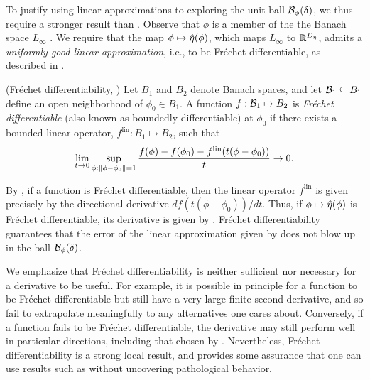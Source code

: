 To justify using linear approximations to exploring the unit ball
$\mathcal{B}_\phi(\delta)$, we thus require a stronger result than
.  Observe that $\phi$ is a member of the the Banach
space $L_\infty$ \citep[Theorem 5.2.1]{dudley:2018:real}.  We require that the
map $\phi \mapsto \hat\eta(\phi)$, which maps $L_\infty$ to
$\mathbb{R}^{D_{\eta}}$, admits a {\em uniformly good linear approximation}, i.e.,
to be Fr{\'e}chet differentiable, as described in .

\begin{defn}
    (Fr{\'e}chet differentiability,
    \citep[Definition 4.5]{zeidler:2013:functional})
%
Let $B_1$ and $B_2$ denote Banach spaces, and let $\mathcal{B}_1 \subseteq B_1$ define
an open neighborhood of $\phi_0 \in B_1$.
%
A function $f: \mathcal{B}_1 \mapsto B_2$ is {\em Fr{\'echet} differentiable} (also
known as boundedly differentiable) at $\phi_0$ if there exists a  bounded linear
operator, $f^{\mathrm{lin}}: B_1 \mapsto B_2$, such that
%
\begin{align*}
%
\lim_{t \rightarrow 0}
    \sup_{\phi: \norm{\phi - \phi_0} = 1}
    \frac{f(\phi) - f(\phi_0) -
          f^{\mathrm{lin}}(t (\phi - \phi_0))
         }{t} \rightarrow 0.
%
\end{align*}
%
\end{defn}

By \citep[Proposition 4.8]{zeidler:2013:functional}, if a function is
Fr{\'e}chet differentiable, then the linear operator $f^{\mathrm{lin}}$ is given
precisely by the directional derivative $d f(t (\phi - \phi_0)) / d t$. Thus, if
$\phi \mapsto \hat\eta(\phi)$ is Fr{\'e}chet differentiable, its derivative is
given by .  Fr{\'e}chet differentiability guarantees
that the error of the linear approximation given by 
does not blow up in the ball $\mathcal{B}_\phi(\delta)$.

We emphasize that Fr{\'e}chet differentiability is neither sufficient nor
necessary for a derivative to be useful.  For example, it is possible in
principle for a function to be Fr{\'e}chet differentiable but still have a very
large finite second derivative, and so fail to extrapolate meaningfully to any
alternatives one cares about.  Conversely, if a function fails to be Fr{\'e}chet
differentiable, the derivative may still perform well in particular directions,
including that chosen by .  Nevertheless, Fr{\'e}chet
differentiability is a strong local result, and provides some assurance that one
can use results such as  without uncovering
pathological behavior.

